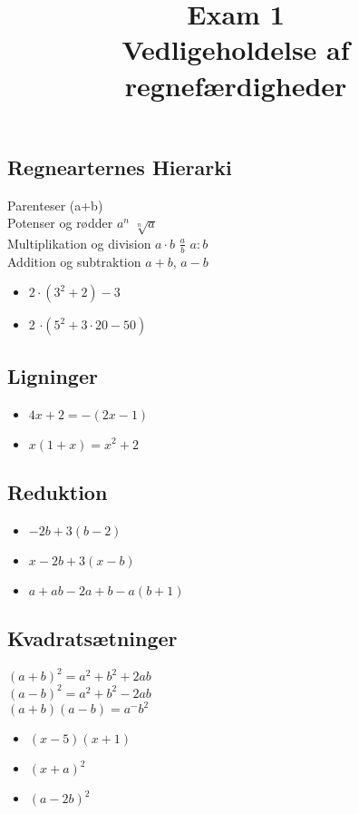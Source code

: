 \documentclass[10pt,a4paper]{article}
\begin{document}
	\title{Exam 1 \\ Vedligeholdelse af regnefærdigheder}
	\maketitle
\subsection*{Regnearternes Hierarki}
Parenteser (a+b) \\
Potenser og rødder $a^n$ $\sqrt[n]{a}$ \\
Multiplikation og division $a \cdot b$ $\frac{a}{b}$ $a:b$ \\
Addition og subtraktion $a+b$, $a-b$


\begin{itemize}
	\item $2 \cdot (3^2+2) -3$ \\
	\item 2 $\cdot (5^2+3\cdot 20-50)$
\end{itemize}

\subsection*{Ligninger}

\begin{itemize}
	\item $4x+2 = -(2x-1)$
	\item $x(1+x)=x^2+2$
\end{itemize}


\subsection*{Reduktion}

\begin{itemize}
	\item $-2b+3(b-2)$
	\item $x-2b+3(x-b)$
	\item $a+ab-2a+b-a(b+1)$
\end{itemize}

\subsection*{Kvadratsætninger}
$(a+b)^2=a^2+b^2+2ab$ \\
$(a-b)^2=a^2+b^2-2ab$ \\
$(a+b)(a-b)=a^-b^2$

\begin{itemize}
	\item $(x-5)(x+1)$
	\item $(x+a)^2$
	\item $(a-2b)^2$
\end{itemize}
\end{document}
